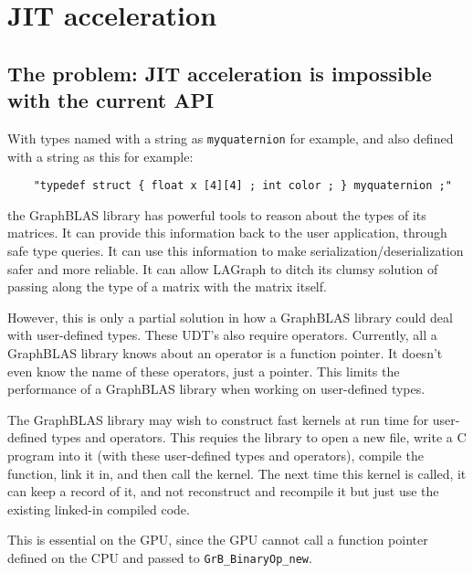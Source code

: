\documentclass[12pt]{article}
\begin{document}
\section{JIT acceleration}

\subsection{The problem: JIT acceleration is impossible with the current API}

With types named with a string as \verb'myquaternion' for example, and
also defined with a string as this for example:

{\footnotesize
\begin{verbatim}
    "typedef struct { float x [4][4] ; int color ; } myquaternion ;"
\end{verbatim}}

\noindent
the GraphBLAS library has powerful tools to reason about the types of
its matrices.  It can provide this information back to the user application,
through safe type queries.  It can use this information to make
serialization/deserialization safer and more reliable.  It can allow
LAGraph to ditch its clumsy solution of passing along the type of a matrix
with the matrix itself.

However, this is only a partial solution in how a GraphBLAS library could deal
with user-defined types.  These UDT's also require operators.  Currently, all a
GraphBLAS library knows about an operator is a function pointer.  It doesn't
even know the name of these operators, just a pointer.  This limits the
performance of a GraphBLAS library when working on user-defined types.

The GraphBLAS library may wish to construct fast kernels at run time for
user-defined types and operators.  This requies the library to open a new
file, write a C program into it (with these user-defined types and operators),
compile the function, link it in, and then call the kernel.
The next time this kernel is called, it can keep a record of it, and
not reconstruct and recompile it but just use the existing linked-in
compiled code.

This is essential on the GPU, since the GPU cannot call a function pointer
defined on the CPU and passed to \verb'GrB_BinaryOp_new'.
\end{document}
